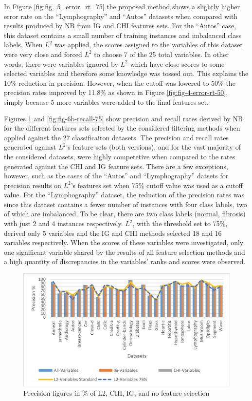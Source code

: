 \documentclass[review]{elsarticle}
\begin{document}
In Figure \ref{fig:fig_5_error_rt_75} the proposed method shows a slightly higher error rate on the “Lymphography” and “Autos” datasets when compared with results produced by NB from IG and CHI features sets. For the “Autos” case, this dataset contains a small number of training instances and imbalanced class labels. When $ L^2 $ was applied, the scores assigned to the variables of this dataset were very close and forced $ L^2 $ to choose 7 of the 25 total variables. In other words, there were variables ignored by $ L^2 $ which have close scores to some selected variables and therefore some knowledge was tossed out. This explains the 10\% reduction in precision. However, when the cutoff was lowered to 50\% the precision rates improved by 11.8\% as shown in Figure \ref{fig:fig-4-error-rt-50}, simply because 5 more variables were added to the final features set. 

Figures \ref{fig:fig-6a-precision-75} and \ref{fig:fig-6b-recall-75} show precision and recall rates derived by NB for the different features sets selected by the considered filtering methods when applied against the 27 classificaiton datasets. The precision and recall rates generated against $ L^2 $’s feature sets (both versions), and for the vast majority of the considered datasets, were highly competetive when compared to the rates generated against the CHI and IG feature sets. There are a few exceptions, however,  such as the cases of the “Autos” and “Lymphography” datsets for precision results on $ L^2 $’s features set when 75\% cutoff value was used as a cutoff value. For the “Lymphography” dataset, the reduction of the precision rates was since this dataset contains a fewer number of instances with four class labels, two of which are imbalanced. To be clear, there are two class labels (normal, fibrosis) with just 2 and 4 instances respectively. $ L^2 $, with the threshold set to 75\%, derived only 5 variables and the IG and CHI methods selected 18 and 16 variables respectively. When the scores of these variables were investigated, only one significant variable shared by the results of all feature selection methods and a high quantity of discrepancies in the variables’ ranks and scores were observed. 


\begin{figure}[h]
	\centering
	\includegraphics[width=0.8\linewidth]{figs/fig_6a_precision_75.png}
	\caption[fig-6a-precision-75]{Precision figures in \% of L2, CHI, IG, and no feature selection  }
	\label{fig:fig-6a-precision-75}
\end{figure}
\end{document}
